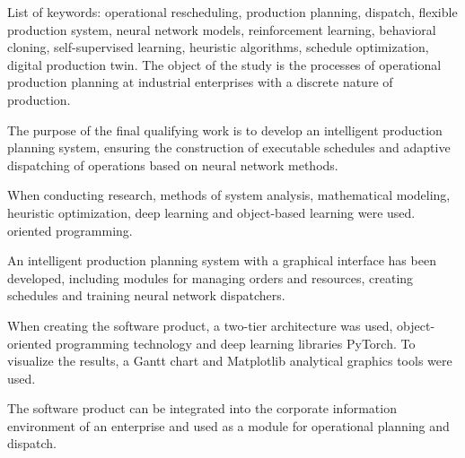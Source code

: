 List of keywords: operational rescheduling, production planning, dispatch, flexible production system, neural network models, reinforcement learning, behavioral cloning, self-supervised learning, heuristic algorithms, schedule optimization, digital production twin.
The object of the study is the processes of operational production planning at industrial enterprises with a discrete nature of production.

The purpose of the final qualifying work is to develop an intelligent production planning system, ensuring the construction of executable schedules and adaptive dispatching of operations based on neural network methods.

When conducting research, methods of system analysis, mathematical modeling, heuristic optimization, deep learning  and object-based learning were used.
oriented programming.

An intelligent production planning system with a graphical interface has been developed, including modules for managing orders and resources, creating schedules and training neural network dispatchers.

When creating the software product, a two-tier architecture was used, object-oriented programming technology and deep learning libraries PyTorch. To visualize the results, a Gantt chart and Matplotlib analytical graphics tools were used.

The software product can be integrated into the corporate information environment of an enterprise and used as a module for operational planning and dispatch.
